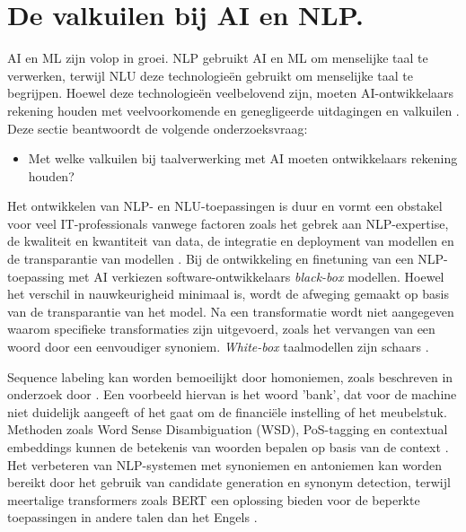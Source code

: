 

\section{De valkuilen bij AI en NLP.}

AI en ML zijn volop in groei. NLP gebruikt AI en ML om menselijke taal te verwerken, terwijl NLU deze technologieën gebruikt om menselijke taal te begrijpen. Hoewel deze technologieën veelbelovend zijn, moeten AI-ontwikkelaars rekening houden met veelvoorkomende en genegligeerde uitdagingen en valkuilen \autocite{Sciforce2020, Roldos2020, Khurana2022}. Deze sectie beantwoordt de volgende onderzoeksvraag: 

\begin{itemize}
	\item Met welke valkuilen bij taalverwerking met AI moeten ontwikkelaars rekening houden?
\end{itemize}

\medspace

Het ontwikkelen van NLP- en NLU-toepassingen is duur en vormt een obstakel voor veel IT-professionals vanwege factoren zoals het gebrek aan NLP-expertise, de kwaliteit en kwantiteit van data, de integratie en deployment van modellen en de transparantie van modellen \autocite{IBM2022}. Bij de ontwikkeling en finetuning van een NLP-toepassing met AI verkiezen software-ontwikkelaars \textit{black-box} modellen. Hoewel het verschil in nauwkeurigheid minimaal is, wordt de afweging gemaakt op basis van de transparantie van het model. Na een transformatie wordt niet aangegeven waarom specifieke transformaties zijn uitgevoerd, zoals het vervangen van een woord door een eenvoudiger synoniem. \textit{White-box} taalmodellen zijn schaars \autocite{Punardeep2020}.

\medspace 

Sequence labeling kan worden bemoeilijkt door homoniemen, zoals beschreven in onderzoek door \textcite{Roldos2020}. Een voorbeeld hiervan is het woord 'bank', dat voor de machine niet duidelijk aangeeft of het gaat om de financiële instelling of het meubelstuk. Methoden zoals Word Sense Disambiguation (WSD), PoS-tagging en contextual embeddings kunnen de betekenis van woorden bepalen op basis van de context \autocite{Eisenstein2019, Liu2020}. Het verbeteren van NLP-systemen met synoniemen en antoniemen kan worden bereikt door het gebruik van candidate generation en synonym detection, terwijl meertalige transformers zoals BERT een oplossing bieden voor de beperkte toepassingen in andere talen dan het Engels \autocite{Dandekar2016, Roldos2020}.


